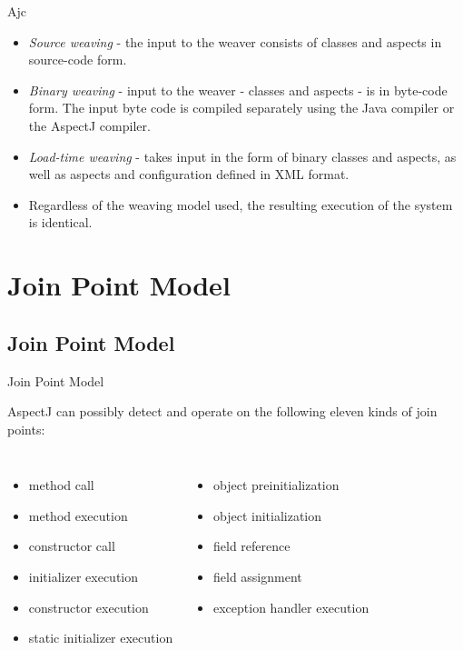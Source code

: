 \documentclass[11pt]{beamer}
\begin{document}
\begin{frame}{Ajc}
  \begin{itemize}
    \item \emph{Source weaving} - the input to the weaver consists of classes and
aspects in source-code form.
    \item \emph{Binary weaving} - input to the weaver - classes and aspects - is in byte-code form. The
input byte code is compiled separately using the Java compiler or the AspectJ compiler.
    \item \emph{Load-time weaving} - takes input in the form of binary classes and aspects, as well as
aspects and configuration defined in XML format.
    \item Regardless of the weaving model used, the resulting execution of the system is identical.
  \end{itemize}
\end{frame}

\section{Join Point Model}
\subsection*{Join Point Model}

\begin{frame}{Join Point Model}

AspectJ can possibly detect and operate on the following eleven kinds of join points:

\begin{columns}
  \begin{itemize}
    \item method call 
    \item method execution 
    \item constructor call 
    \item initializer execution 
    \item constructor execution 
    \item static initializer execution 
  \end{itemize}

  \begin{itemize}
    \item object preinitialization 
    \item object initialization 
    \item field reference 
    \item field assignment 
    \item exception handler execution
  \end{itemize}
\end{columns}
\end{frame}
\end{document}
